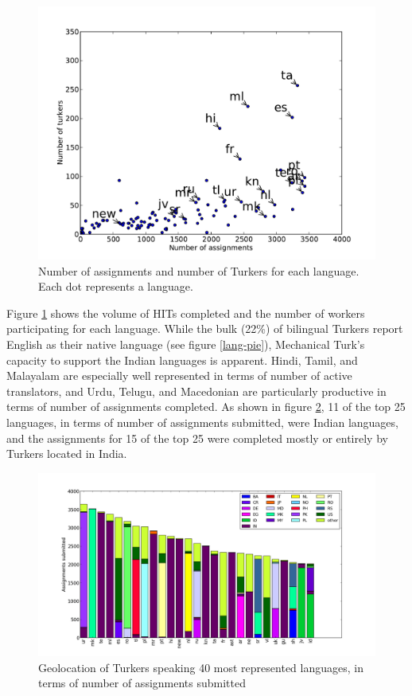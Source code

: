 \documentclass[11pt]{article}
\begin{document}
\begin{figure}[h]
\centering
\includegraphics[width=6in]{figures/assign-turk-scatter}
\caption{Number of assignments and number of Turkers for each language. Each dot represents a language.}
\label{ass-scatter}
\end{figure}

Figure \ref{ass-scatter} shows the volume of HITs completed and the number of workers participating for each language. While the bulk (22\%) of bilingual Turkers report English as their native language (see figure \ref{lang-pie}), Mechanical Turk's capacity to support the Indian languages is apparent. Hindi, Tamil, and Malayalam are especially well represented in terms of number of active translators, and Urdu, Telugu, and Macedonian are particularly productive in terms of number of assignments completed. As shown in figure \ref{langgeo-bar}, 11 of the top 25 languages, in terms of number of assignments submitted, were Indian languages, and the assignments for 15 of the top 25 were completed mostly or entirely by Turkers located in India. 

\begin{figure}[h]
\centering
\includegraphics[width=6in]{figures/assign-langgeo-sorted}
\caption{Geolocation of Turkers speaking 40 most represented languages, in terms of number of assignments submitted}
\label{langgeo-bar}
\end{figure}
\end{document}
